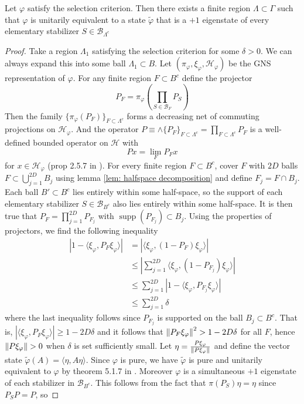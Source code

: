 \documentclass[11pt]{amsart}
\begin{document}
\begin{thm}
    Let $\varphi$ satisfy the selection criterion. Then there exists a finite region $\Lambda\subset\Gamma$ such that $\varphi$ is unitarily equivalent to a state $\tilde\varphi$ that is a $+1$ eigenstate of every elementary stabilizer $S\in \mathcal B_{\Lambda^c}$   
    \begin{proof}
        Take a region $\Lambda_1$ satisfying the selection criterion for some $\delta>0$. We can always expand this into some ball $\Lambda_1\subset B$. Let $(\pi_\varphi,\xi_\varphi,\mathcal H_\varphi)$ be the GNS representation of $\varphi$. For any finite region $F\subset B^c$ define the projector 
        \[
            P_{F}=\pi_\varphi(\prod_{S\in\mathcal{B}_{F}}P_S)
        \]
        Then the family $\{\pi_\varphi (P_F)\}_{F\subset{\Lambda^c}}$ forms a decreasing net of commuting projections on $\mathcal H_\varphi$. And the operator $P\equiv\wedge\{ P_F\}_{F\subset{\Lambda^c}}=\prod_{F\subset{\Lambda^c}}P _F$ is a well-defined bounded operator on $\mathcal H$ with 
        \[
            Px=\lim_{F}P_Fx
        \]
        for $x\in \mathcal{H}_\varphi$ (prop 2.5.7 in \cite{kadison_1983}). For every finite region $F\subset B^c$, cover $F$ with $2D$ balls  $F\subset\bigcup_{j=1}^{2D} B_j$ using lemma \ref{lem: halfspace decomposition} and define $F_j=F\cap B_j$. Each ball $B'\subset B^c $ lies entirely within some half-space, so the support of each elementary stabilizer $S\in \mathcal B_{B^c}$ also lies entirely within some half-space. It is then  true that $P_F=\prod_{j=1}^{2D}P_{F_j}$ with $\operatorname{supp}(P_{F_j})\subset B_j$. Using the properties of projectors, we find the following inequality
        \begin{align*}
            |1-\langle\xi_\varphi, P_F\xi_\varphi\rangle|&=|\langle\xi_\varphi, (1-P_F)\xi_\varphi\rangle| \\
            &\leq |\sum_{j=1}^{2D} \langle\xi_\varphi, (1-P_{F_j})\xi_\varphi\rangle|\\
            &\leq\sum_{j=1}^{2D}|1- \langle\xi_\varphi, P_{F_j}\xi_\varphi\rangle| \\
            & \leq\sum_{j=1}^{2D}\delta
        \end{align*}
        where the last inequality follows since $P_{F_j}$ is supported on the ball $B_j\subset B^c$. That is, $|\langle\xi_\varphi,P_F\xi_\varphi\rangle|\geq1-2D\delta$ and it follows that $\left\lVert P_F\xi_\varphi\right\rVert^2>1-2D\delta$ for all $F$, hence $\left\lVert P\xi_\varphi\right\rVert>0$ when $\delta$ is set sufficiently small. Let $\eta=\frac{P\xi_\varphi}{\left\lVert P\xi_\varphi\right\rVert}$ and define the vector state $\tilde\varphi(A)=\langle\eta,A\eta\rangle$. Since $\varphi$ is pure, we have $\tilde\varphi$ is pure and unitarily equivalent to $\varphi$ by theorem 5.1.7 in \cite{Murphy_1990}. Moreover $\varphi$ is a simultaneous $+1$ eigenstate of each stabilizer in $\mathcal B_{B^c}$. This follows from the fact that $\pi(P_S)\eta=\eta$ since $P_SP=P$, so

\end{proof}
\end{thm}
\end{document}
